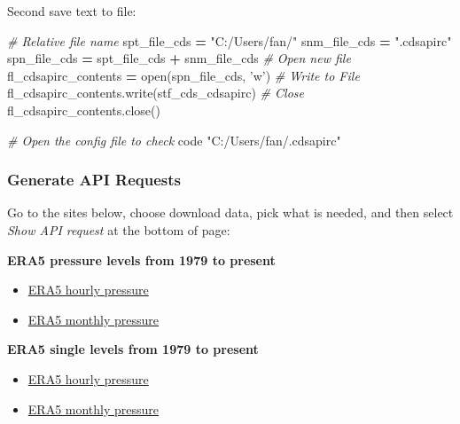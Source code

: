 \documentclass[
]{book}
\newenvironment{Shaded}{\begin{snugshade}}{\end{snugshade}}
\newcommand{\BuiltInTok}[1]{#1}
\newcommand{\CommentTok}[1]{\textcolor[rgb]{0.56,0.35,0.01}{\textit{#1}}}
\newcommand{\ExtensionTok}[1]{#1}
\newcommand{\NormalTok}[1]{#1}
\newcommand{\OperatorTok}[1]{\textcolor[rgb]{0.81,0.36,0.00}{\textbf{#1}}}
\newcommand{\StringTok}[1]{\textcolor[rgb]{0.31,0.60,0.02}{#1}}
\providecommand{\tightlist}{%
  \setlength{\itemsep}{0pt}\setlength{\parskip}{0pt}}
\begin{document}
Second save text to file:

\begin{Shaded}
\begin{Highlighting}[]
\CommentTok{# Relative file name}
\NormalTok{spt_file_cds }\OperatorTok{=} \StringTok{"C:/Users/fan/"}
\NormalTok{snm_file_cds }\OperatorTok{=} \StringTok{".cdsapirc"}
\NormalTok{spn_file_cds }\OperatorTok{=}\NormalTok{ spt_file_cds }\OperatorTok{+}\NormalTok{ snm_file_cds}
\CommentTok{# Open new file}
\NormalTok{fl_cdsapirc_contents }\OperatorTok{=} \BuiltInTok{open}\NormalTok{(spn_file_cds, }\StringTok{'w'}\NormalTok{)}
\CommentTok{# Write to File}
\NormalTok{fl_cdsapirc_contents.write(stf_cds_cdsapirc)}
\CommentTok{# Close}
\NormalTok{fl_cdsapirc_contents.close()}
\end{Highlighting}
\end{Shaded}

\begin{Shaded}
\begin{Highlighting}[]
\CommentTok{# Open the config file to check}
\ExtensionTok{code} \StringTok{"C:/Users/fan/.cdsapirc"}
\end{Highlighting}
\end{Shaded}

\hypertarget{generate-api-requests}{%
\subsubsection{Generate API Requests}\label{generate-api-requests}}

Go to the sites below, choose download data, pick what is needed, and then select \emph{Show API request} at the bottom of page:

\textbf{ERA5 pressure levels from 1979 to present}

\begin{itemize}
\tightlist
\item
  \href{https://cds.climate.copernicus.eu/cdsapp\#!/dataset/reanalysis-era5-pressure-levels}{ERA5 hourly pressure}
\item
  \href{https://cds.climate.copernicus.eu/cdsapp\#!/dataset/reanalysis-era5-pressure-levels-monthly-means}{ERA5 monthly pressure}
\end{itemize}

\textbf{ERA5 single levels from 1979 to present}

\begin{itemize}
\tightlist
\item
  \href{https://cds.climate.copernicus.eu/cdsapp\#!/dataset/reanalysis-era5-single-levels}{ERA5 hourly pressure}
\item
  \href{https://cds.climate.copernicus.eu/cdsapp\#!/dataset/reanalysis-era5-single-levels-monthly-means}{ERA5 monthly pressure}
\end{itemize}
\end{document}
